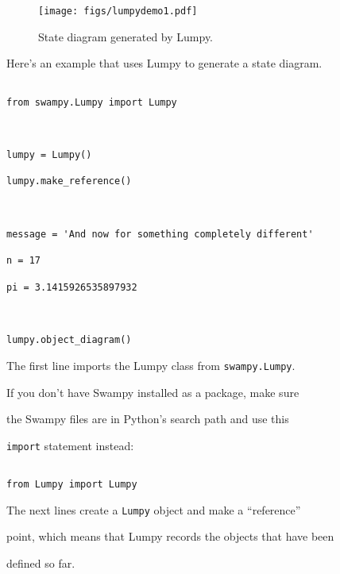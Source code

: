 \begin{figure}

\centerline

{\texttt{[image: figs/lumpydemo1.pdf]}}

\caption{State diagram generated by Lumpy.}

\label{fig.lumpy1}

\end{figure}



Here's an example that uses Lumpy to generate a state diagram.

 



\begin{verbatim}

from swampy.Lumpy import Lumpy



lumpy = Lumpy()

lumpy.make_reference()



message = 'And now for something completely different'

n = 17

pi = 3.1415926535897932



lumpy.object_diagram()

\end{verbatim}



The first line imports the Lumpy class from {\tt swampy.Lumpy}.

If you don't have Swampy installed as a package, make sure

the Swampy files are in Python's search path and use this

{\tt import} statement instead:



\begin{verbatim}

from Lumpy import Lumpy

\end{verbatim}



The next lines create a {\tt Lumpy} object and make a ``reference''

point, which means that Lumpy records the objects that have been

defined so far.



